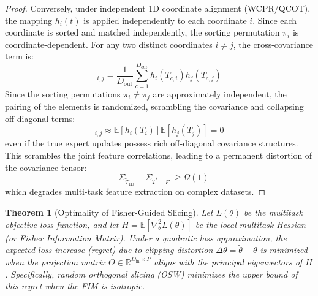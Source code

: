 \documentclass{article}
\theoremstyle{plain}
\newtheorem{theorem}{Theorem}[section]
\theoremstyle{definition}
\theoremstyle{remark}
\begin{document}
\begin{proof}
Conversely, under independent 1D coordinate alignment (WCPR/QCOT), the mapping $h_i(t)$ is applied independently to each coordinate $i$. Since each coordinate is sorted and matched independently, the sorting permutation $\pi_i$ is coordinate-dependent. For any two distinct coordinates $i \ne j$, the cross-covariance term is:
\begin{equation}
[\Sigma_{\tilde{T}_{\text{1D}}}]_{i, j} = \frac{1}{D_{\text{out}}} \sum_{c=1}^{D_{\text{out}}} h_i(T_{c, i}) h_j(T_{c, j})
\end{equation}
Since the sorting permutations $\pi_i \ne \pi_j$ are approximately independent, the pairing of the elements is randomized, scrambling the covariance and collapsing off-diagonal terms:
\begin{equation}
[\Sigma_{\tilde{T}_{\text{1D}}}]_{i, j} \approx \mathbb{E}[h_i(T_i)] \mathbb{E}[h_j(T_j)] = 0
\end{equation}
even if the true expert updates possess rich off-diagonal covariance structures. This scrambles the joint feature correlations, leading to a permanent distortion of the covariance tensor:
\begin{equation}
\|\Sigma_{\tilde{T}_{\text{1D}}} - \Sigma_{T^*}\|_F \ge \Omega(1)
\end{equation}
which degrades multi-task feature extraction on complex datasets.
\end{proof}

\begin{theorem}[Optimality of Fisher-Guided Slicing]
\label{thm:fisher}
Let $L(\theta)$ be the multitask objective loss function, and let $H = \mathbb{E}[\nabla^2_{\theta} L(\theta)]$ be the local multitask Hessian (or Fisher Information Matrix). Under a quadratic loss approximation, the expected loss increase (regret) due to clipping distortion $\Delta \theta = \tilde{\theta} - \theta$ is minimized when the projection matrix $\Theta \in \mathbb{R}^{D_{\text{in}} \times P}$ aligns with the principal eigenvectors of $H$. Specifically, random orthogonal slicing (OSW) minimizes the upper bound of this regret when the FIM is isotropic.
\end{theorem}
\end{document}
